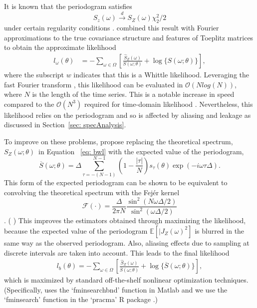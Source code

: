 \documentclass{stat572Style}
\newcommand{\hdcomment}[1]{({\color{red}{HD's comment:}} \textbf{\color{red}{#1}})}
\begin{document}
 It is known that  the periodogram satisfies
\begin{equation}
\hat{S}_{z}(\omega) \overset{d}{\rightarrow} S_{Z}(\omega) \chi^{2}_{2}/2
\end{equation}
under certain regularity conditions \citep{Contreras2006}. 
\citet{Whittle1953} combined this result with Fourier approximations to the true covariance structure and features of Toeplitz matrices to obtain the approximate likelihood
\begin{align}
l_{\omega}(\theta) 
&= -\sum_{\omega \in \Omega} \left[ \frac{\hat{S}_{Z}(\omega)}{S(\omega;\theta)}  + \log  \{ S(\omega; \theta) \}\right],
\end{align}
where the subscript $w$ indicates that this is a Whittle likelihood. 
Leveraging the fast Fourier transform \citep{Cooley1965}, this  likelihood can be evaluated in $\mathcal{O}(N log(N))$, where $N$ is the length of the time series. 
This is a notable increase in speed compared to the $\mathcal{O}(N^{3})$  required for time-domain likelihood  \citep{Sykulski2016}. 
  Nevertheless, this likelihood relies on the periodogram and so is affected by aliasing and leakage as discussed in Section~\ref{sec: specAnalysis}. 
 
To improve on these problems, \citet{Sykulski2013} propose replacing the theoretical spectrum, $S_{Z}(\omega; \theta)$\, in Equation ~\ref{eq: bwl} with the expected value of the periodogram, 
\begin{equation}
\overline{S}(\omega; \theta) = \Delta \sum_{\tau = - (N - 1)}^{N-1} \left(1 - \frac{|\tau|}{N} \right)s_{\tau}(\theta) \exp ( - i \omega \tau \Delta).
\end{equation} 
This form of the expected periodogram can be shown to be equivalent to convolving the theoretical spectrum with the Fej\'{e}r kernel 
\begin{equation}
\mathcal{F}(\cdot) = \frac{\Delta}{2\pi N} \frac{\sin^{2}(N \omega \Delta/2)}{\sin^{2}(\omega \Delta /2)} 
\end{equation} \citep{Sykulski2013}. 
\hdcomment{sentence wrong, look this up!} This improves the estimators obtained through maximizing the likelihood, because the expected value of the periodogram $\mathbb{E}[|J_{Z}(\omega)^{2}]$ is blurred in the same way as the observed periodogram. Also, aliasing effects due to sampling at discrete intervals are taken into account. 
This leads to the final likelihood
\begin{align}
l_{b}(\theta) = - \sum_{\omega \in \Omega} \left[\frac{\hat{S}_{Z}(\omega)}{\overline{S}(\omega; \theta)} + \log \{ \overline{S} (\omega; \theta) \}\right],
\end{align}
which is maximized by standard off-the-shelf nonlinear optimization techniques. (Specifically, \citet{Sykulski2016} uses the `fminsearchbnd' function in Matlab \citep{DErrico2006} and we use the `fminsearch' function in the `pracma' R package \citep{Borchers2015}.) 
\end{document}
